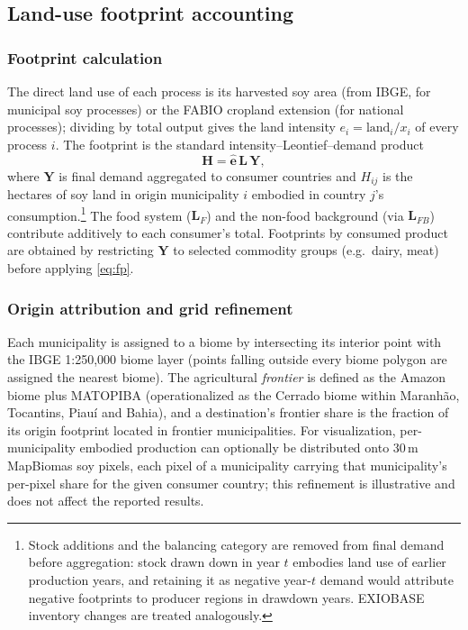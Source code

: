 \subsection{Land-use footprint accounting}\label{subsec:footprint}

\subsubsection{Footprint calculation}\label{subsubsec:stressor}
The direct land use of each process is its harvested soy area (from IBGE, for
municipal soy processes) or the FABIO cropland extension (for
national processes); dividing by total output gives the land intensity
$e_i=\text{land}_i/x_i$ of every process $i$. The footprint is the standard
intensity--Leontief--demand product
\begin{equation}\label{eq:fp}
  \mathbf{H}=\hat{\mathbf{e}}\,\mathbf{L}\,\mathbf{Y},
\end{equation}
where $\mathbf{Y}$ is final demand aggregated to consumer countries and
$H_{ij}$ is the hectares of soy land in origin municipality $i$ embodied in
country $j$'s consumption.\footnote{Stock additions and the balancing category
are removed from final demand before aggregation: stock drawn down in year $t$
embodies land use of earlier production years, and retaining it as negative
year-$t$ demand would attribute negative footprints to producer regions in
drawdown years. EXIOBASE inventory changes are treated analogously.} The food
system ($\mathbf{L}_F$) and the non-food background (via $\mathbf{L}_{FB}$)
contribute additively to each consumer's total. Footprints by consumed
product are obtained by restricting $\mathbf{Y}$ to selected commodity groups
(e.g.\ dairy, meat) before applying \eqref{eq:fp}.


\subsubsection{Origin attribution and grid refinement}\label{subsubsec:attribution}
Each municipality is assigned to a biome by intersecting its interior point
with the IBGE 1:250{,}000 biome layer (points falling outside every biome
polygon are assigned the nearest biome). The agricultural \emph{frontier} is
defined as the Amazon biome plus MATOPIBA (operationalized as the Cerrado
biome within Maranh\~ao, Tocantins, Piau\'i and Bahia), and a destination's
frontier share is the fraction of its origin footprint located in frontier
municipalities. For visualization, per-municipality embodied production can
optionally be distributed onto 30\,m MapBiomas soy pixels, each pixel of a
municipality carrying that municipality's per-pixel share for the given
consumer country; this refinement is illustrative and does not affect the
reported results.

